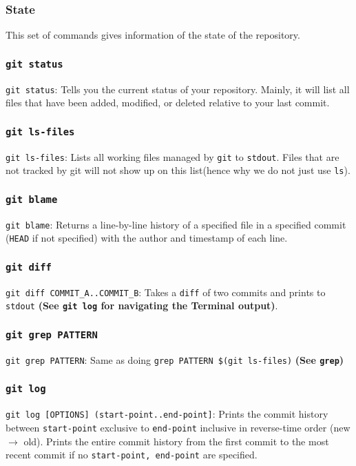 \documentclass[13pt]{article}
\begin{document}
\subsubsection{State}
This set of commands gives information of the state of the repository.

\subsubsection*{\texttt{git status}}
\texttt{git status}: Tells you the current status of your repository. Mainly, it will list all files that have been added, modified, or deleted relative to your last commit.

\subsubsection*{\texttt{git ls-files}}
\texttt{git ls-files}: Lists all working files managed by \texttt{git} to \texttt{stdout}. Files that are not tracked by git will not show up on this list(hence why we do not just use \texttt{ls}).

\subsubsection*{\texttt{git blame}}
\texttt{git blame}: Returns a line-by-line history of a specified file in a specified commit (\texttt{HEAD} if not specified) with the author and timestamp of each line.

\subsubsection*{\texttt{git diff}}
\texttt{git diff COMMIT\_A..COMMIT\_B}: Takes a \texttt{diff} of two commits and prints to \texttt{stdout} \textbf{(See \texttt{git log} for navigating the Terminal output)}.

\subsubsection*{\texttt{git grep PATTERN}}
\texttt{git grep PATTERN}: Same as doing \texttt{grep PATTERN \$(git ls-files)} \textbf{(See \texttt{grep})}

\subsubsection*{\texttt{git log}}
\texttt{git log [OPTIONS] (start-point..end-point]}: Prints the commit history between \texttt{start-point} exclusive to \texttt{end-point} inclusive in reverse-time order (new $\rightarrow$ old). Prints the entire commit history from the first commit to the most recent commit if no \texttt{start-point, end-point} are specified.
\end{document}
